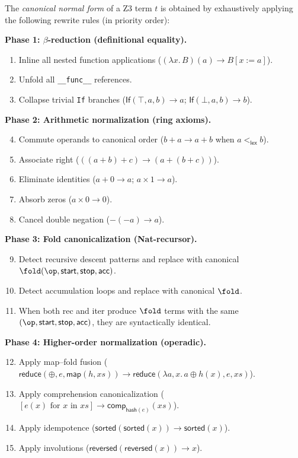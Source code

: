 \begin{definition}
\label{def:cnf}
The \emph{canonical normal form} of a Z3 term $t$ is obtained by
exhaustively applying the following rewrite rules (in priority order):

\textbf{Phase 1: $\beta$-reduction (definitional equality).}
\begin{enumerate}
  \item Inline all nested function applications
    ($(\lambda x.\, B)(a) \to B[x := a]$).
  \item Unfold all \texttt{\_\_func\_\_} references.
  \item Collapse trivial \texttt{If} branches
    ($\mathsf{If}(\top, a, b) \to a$; $\mathsf{If}(\bot, a, b) \to b$).
\end{enumerate}

\textbf{Phase 2: Arithmetic normalization (ring axioms).}
\begin{enumerate}
  \setcounter{enumi}{3}
  \item Commute operands to canonical order
    ($b + a \to a + b$ when $a <_\mathsf{lex} b$).
  \item Associate right ($((a+b)+c) \to (a+(b+c))$).
  \item Eliminate identities ($a + 0 \to a$; $a \times 1 \to a$).
  \item Absorb zeros ($a \times 0 \to 0$).
  \item Cancel double negation ($-(-a) \to a$).
\end{enumerate}

\textbf{Phase 3: Fold canonicalization (Nat-recursor).}
\begin{enumerate}
  \setcounter{enumi}{8}
  \item Detect recursive descent patterns and replace with
    canonical $\fold(\op, \mathsf{start}, \mathsf{stop}, \mathsf{acc})$.
  \item Detect accumulation loops and replace with canonical $\fold$.
  \item When both rec and iter produce $\fold$ terms with the same
    $(\op, \mathsf{start}, \mathsf{stop}, \mathsf{acc})$, they
    are syntactically identical.
\end{enumerate}

\textbf{Phase 4: Higher-order normalization (operadic).}
\begin{enumerate}
  \setcounter{enumi}{11}
  \item Apply map--fold fusion
    ($\mathsf{reduce}(\oplus, e, \mathsf{map}(h, xs)) \to
    \mathsf{reduce}(\lambda a,x.\, a \oplus h(x), e, xs)$).
  \item Apply comprehension canonicalization
    ($[e(x) \text{ for } x \text{ in } xs] \to
    \mathsf{comp}_{\mathsf{hash}(e)}(xs)$).
  \item Apply idempotence ($\mathsf{sorted}(\mathsf{sorted}(x)) \to
    \mathsf{sorted}(x)$).
  \item Apply involutions ($\mathsf{reversed}(\mathsf{reversed}(x))
    \to x$).
\end{enumerate}


\end{definition}
